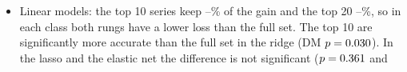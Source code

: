 \begin{itemize}
\begin{itemize}
    ($p = \rhldEBLgbmBarPTwentyFull$ and \rhldEBXgbBarPTwentyFull).
    The random forest, refitted only monthly, reads \rhldRfBarVerdict{} on that ladder, as the boosted trees do: its
    top 10 keep \rhldRfBarRTen\% and its top 5 \rhldRfBarRFive\% of its monthly gain.
  \item Linear models: the top 10 series keep \rhldEBLinRTenMin{}--\rhldEBLinRTenMax{}\% of the gain and the top 20
    \rhldEBLinRTwentyMin{}--\rhldEBLinRTwentyMax\%, so in each class both rungs have a lower loss than the full set.
    The top 10 are significantly more accurate than the full set in the ridge (DM $p = 0.030$). In
    the lasso and the elastic net the difference is not significant ($p = 0.361$ and

\end{itemize}
\end{itemize}

